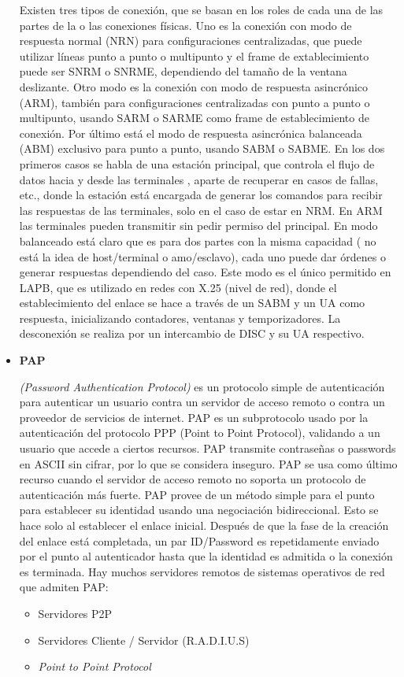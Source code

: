 \documentclass[a4paper,12pt]{article}
\begin{document}
\begin{itemize}
 Existen tres tipos de conexión, que se basan en los roles de cada una de las partes de la o las conexiones
físicas.
Uno es la conexión con modo de respuesta normal (NRN) para configuraciones centralizadas, que puede
utilizar líneas punto a punto o multipunto y el frame de extablecimiento puede ser SNRM o SNRME,
dependiendo del tamaño de la ventana deslizante.
Otro modo es la conexión con modo de respuesta asincrónico (ARM), también para configuraciones
centralizadas con punto a punto o multipunto, usando SARM o SARME como frame de establecimiento de
conexión.
Por último está el modo de respuesta asincrónica balanceada (ABM) exclusivo para punto a punto, usando
SABM o SABME.
En los dos primeros casos se habla de una estación principal, que controla el flujo de datos hacia y desde
las terminales , aparte de recuperar en casos de fallas, etc., donde la estación está encargada de generar
los comandos para recibir las respuestas de las terminales, solo en el caso de estar en NRM. En ARM las
terminales pueden transmitir sin pedir permiso del principal.
En modo balanceado está claro que es para dos partes con la misma capacidad ( no está la idea de
host/terminal o amo/esclavo), cada uno puede dar órdenes o generar respuestas dependiendo del caso.
Este modo es el único permitido en LAPB, que es utilizado en redes con X.25 (nivel de red), donde el
establecimiento del enlace se hace a través de un SABM y un UA como respuesta, inicializando
contadores, ventanas y temporizadores.
La desconexión se realiza por un intercambio de DISC y su UA respectivo.

 \item \textbf{PAP}
 
 \textit{(Password Authentication Protocol)} es un protocolo simple de autenticación para autenticar un usuario contra un servidor de acceso remoto o contra un proveedor
 de servicios de internet. PAP es un subprotocolo usado por la autenticación del protocolo PPP (Point to Point Protocol), 
 validando a un usuario que accede a ciertos recursos. PAP transmite contraseñas o passwords en ASCII sin cifrar, por lo que se considera inseguro. 
 PAP se usa como último recurso cuando el servidor de acceso remoto no soporta un protocolo de autenticación más fuerte.
 PAP provee de un método simple para el punto para establecer su identidad usando una negociación bidireccional. 
 Esto se hace solo al establecer el enlace inicial. Después de que la fase de la creación del enlace está completada, un par ID/Password es repetidamente enviado por 
 el punto al autenticador hasta que la identidad es admitida o la conexión es terminada.
 Hay muchos servidores remotos de sistemas operativos de red que admiten PAP:
 \begin{itemize}
  \item Servidores P2P
  \item Servidores Cliente / Servidor (R.A.D.I.U.S)
  \item \textit{Point to Point Protocol}
 \end{itemize}


\end{itemize}
\end{document}
